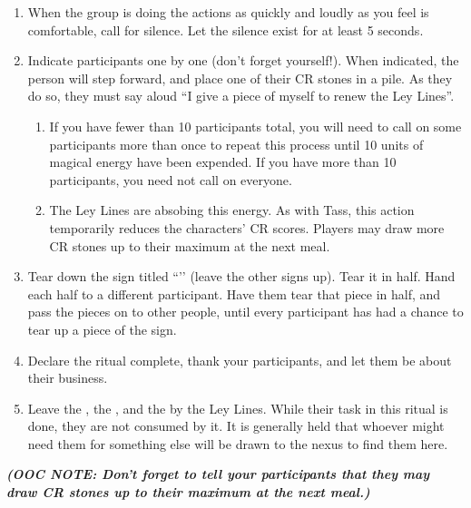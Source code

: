 \documentclass[green]{GL2020}
\begin{document}
\begin{enumerate}
  \item When the group is doing the actions as quickly and loudly as you feel is comfortable, call for silence. Let the silence exist for at least 5 seconds.
  \item Indicate participants one by one (don’t forget yourself!). When indicated, the person will step forward, and place one of their CR stones in a pile. As they do so, they must say aloud “I give a piece of myself to renew the Ley Lines”. 
    \begin{enumerate}
    \item If you have fewer than 10 participants total, you will need to call on some participants more than once to repeat this process until 10 units of magical energy have been expended. If you have more than 10 participants, you need not call on everyone.
    \item The Ley Lines are absobing this energy. As with Tass, this action temporarily reduces the characters’ CR scores. Players may draw more CR stones up to their maximum at the next meal.
  \end{enumerate}  
  \item Tear down the sign titled ``\sLeyLinesSad{}’’ (leave the other signs up). Tear it in half. Hand each half to a different participant. Have them tear that piece in half, and pass the pieces on to other people, until every participant has had a chance to tear up a piece of the sign.
  \item Declare the ritual complete, thank your participants, and let them be about their business.
  \item Leave the \iClay{}, the \iObsidian{}, and the \iLimestone{} by the Ley Lines. While their task in this ritual is done, they are not consumed by it. It is generally held that whoever might need them for something else will be drawn to the nexus to find them here.
\end{enumerate}

\emph{\textbf{(OOC NOTE: Don’t forget to tell your participants that they may draw CR stones up to their maximum at the next meal.)}}
\end{document}
